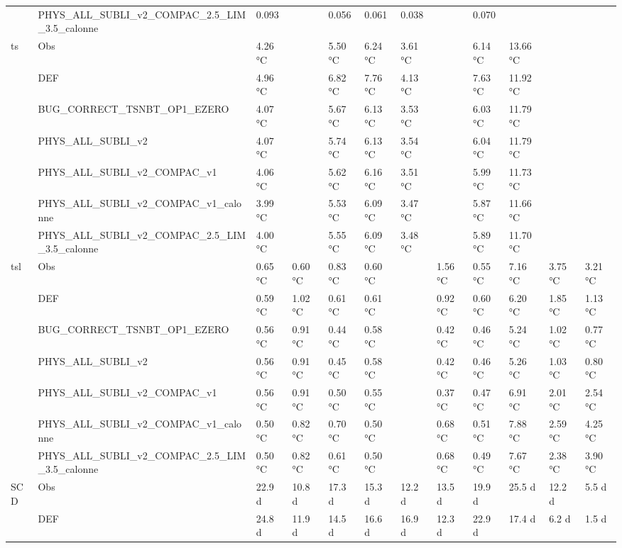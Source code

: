 \begin{tabular}{llllllllllll}
 & PHYS_ALL_SUBLI_v2_COMPAC_2.5_LIM_3.5_calonne & 0.093 &  & 0.056 & 0.061 & 0.038 &  & 0.070 &  &  &  \\
\cline{1-12}
\multirow[t]{7}{*}{ts} & Obs & 4.26 °C &  & 5.50 °C & 6.24 °C & 3.61 °C &  & 6.14 °C & 13.66 °C &  &  \\
 & DEF & 4.96 °C &  & 6.82 °C & 7.76 °C & 4.13 °C &  & 7.63 °C & 11.92 °C &  &  \\
 & BUG_CORRECT_TSNBT_OP1_EZERO & 4.07 °C &  & 5.67 °C & 6.13 °C & 3.53 °C &  & 6.03 °C & 11.79 °C &  &  \\
 & PHYS_ALL_SUBLI_v2 & 4.07 °C &  & 5.74 °C & 6.13 °C & 3.54 °C &  & 6.04 °C & 11.79 °C &  &  \\
 & PHYS_ALL_SUBLI_v2_COMPAC_v1 & 4.06 °C &  & 5.62 °C & 6.16 °C & 3.51 °C &  & 5.99 °C & 11.73 °C &  &  \\
 & PHYS_ALL_SUBLI_v2_COMPAC_v1_calonne & 3.99 °C &  & 5.53 °C & 6.09 °C & 3.47 °C &  & 5.87 °C & 11.66 °C &  &  \\
 & PHYS_ALL_SUBLI_v2_COMPAC_2.5_LIM_3.5_calonne & 4.00 °C &  & 5.55 °C & 6.09 °C & 3.48 °C &  & 5.89 °C & 11.70 °C &  &  \\
\cline{1-12}
\multirow[t]{7}{*}{tsl} & Obs & 0.65 °C & 0.60 °C & 0.83 °C & 0.60 °C &  & 1.56 °C & 0.55 °C & 7.16 °C & 3.75 °C & 3.21 °C \\
 & DEF & 0.59 °C & 1.02 °C & 0.61 °C & 0.61 °C &  & 0.92 °C & 0.60 °C & 6.20 °C & 1.85 °C & 1.13 °C \\
 & BUG_CORRECT_TSNBT_OP1_EZERO & 0.56 °C & 0.91 °C & 0.44 °C & 0.58 °C &  & 0.42 °C & 0.46 °C & 5.24 °C & 1.02 °C & 0.77 °C \\
 & PHYS_ALL_SUBLI_v2 & 0.56 °C & 0.91 °C & 0.45 °C & 0.58 °C &  & 0.42 °C & 0.46 °C & 5.26 °C & 1.03 °C & 0.80 °C \\
 & PHYS_ALL_SUBLI_v2_COMPAC_v1 & 0.56 °C & 0.91 °C & 0.50 °C & 0.55 °C &  & 0.37 °C & 0.47 °C & 6.91 °C & 2.01 °C & 2.54 °C \\
 & PHYS_ALL_SUBLI_v2_COMPAC_v1_calonne & 0.50 °C & 0.82 °C & 0.70 °C & 0.50 °C &  & 0.68 °C & 0.51 °C & 7.88 °C & 2.59 °C & 4.25 °C \\
 & PHYS_ALL_SUBLI_v2_COMPAC_2.5_LIM_3.5_calonne & 0.50 °C & 0.82 °C & 0.61 °C & 0.50 °C &  & 0.68 °C & 0.49 °C & 7.67 °C & 2.38 °C & 3.90 °C \\
\cline{1-12}
\multirow[t]{7}{*}{SCD} & Obs & 22.9 d & 10.8 d & 17.3 d & 15.3 d & 12.2 d & 13.5 d & 19.9 d & 25.5 d & 12.2 d & 5.5 d \\
 & DEF & 24.8 d & 11.9 d & 14.5 d & 16.6 d & 16.9 d & 12.3 d & 22.9 d & 17.4 d & 6.2 d & 1.5 d \\

\end{tabular}
